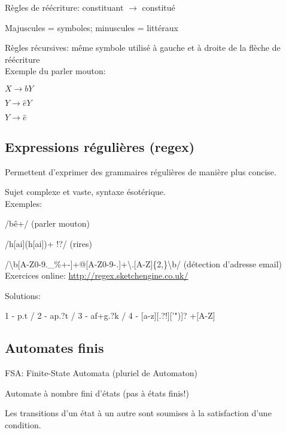 Règles de réécriture: constituant $\rightarrow$ constitué

Majuscules = symboles; minuscules = littéraux

Règles récursives: même symbole utilisé à gauche et à droite de la flèche de réécriture\\

Exemple du parler mouton:

$ X \rightarrow bY $

$ Y \rightarrow \hat e Y $

$ Y \rightarrow \hat e $

\subsection{Expressions régulières (regex)}

Permettent d'exprimer des grammaires régulières de manière plus concise.

Sujet complexe et vaste, syntaxe ésotérique.\\

Exemples:

/bê+/ (parler mouton)

/h[ai](h[ai])+  !?/ (rires)

/\textbackslash b[A-Z0-9.\_\%+-]+@[A-Z0-9-.]+\textbackslash .[A-Z]\{2,\}\textbackslash b/ (détection d'adresse email)\\

Exercices online: \url{http://regex.sketchengine.co.uk/}

Solutions:

1 - p.t /
2 - ap.?t /
3 - af+g.?k /
4 - [a-z][.?!]['")]? +[A-Z]

\subsection{Automates finis}

FSA: Finite-State Automata (pluriel de Automaton)

Automate à nombre fini d'états (pas à états finis!)

Les transitions d'un état à un autre sont soumises à la satisfaction d'une condition.

\vspace{0.5cm}

\begin{center}
\resizebox{0.50\textwidth}{!}{
    
}
\end{center}

\vspace{0.5cm}

